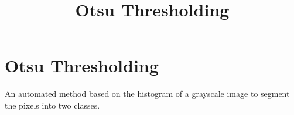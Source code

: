 \documentclass{../template/texnote}
\title{Otsu Thresholding}
\begin{document}
    \maketitle {}
\section{Otsu Thresholding}
An automated method based on the histogram of a grayscale image to segment the pixels into two classes.
    \printbibliography
\end{document}
